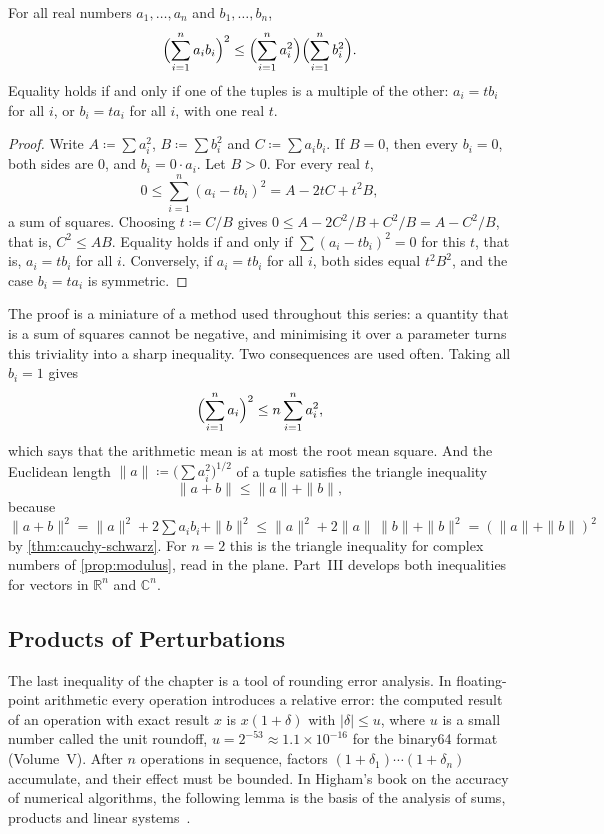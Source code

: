 \begin{theorem}
\label{thm:cauchy-schwarz}
For all real numbers $a_1,\ldots,a_n$ and $b_1,\ldots,b_n$,
\[
\Bigl(\sum_{i=1}^na_ib_i\Bigr)^2\le\Bigl(\sum_{i=1}^na_i^2\Bigr)\Bigl(\sum_{i=1}^nb_i^2\Bigr).
\]
Equality holds if and only if one of the tuples is a multiple of the other: $a_i=tb_i$ for all $i$, or $b_i=ta_i$ for all $i$, with one real $t$.
\end{theorem}

\begin{proof}
Write $A\coloneqq\sum a_i^2$, $B\coloneqq\sum b_i^2$ and $C\coloneqq\sum a_ib_i$. If $B=0$, then every $b_i=0$, both sides are $0$, and $b_i=0\cdot a_i$. Let $B>0$. For every real $t$,
\[
0\le\sum_{i=1}^n(a_i-tb_i)^2=A-2tC+t^2B ,
\]
a sum of squares. Choosing $t\coloneqq C/B$ gives $0\le A-2C^2/B+C^2/B=A-C^2/B$, that is, $C^2\le AB$. Equality holds if and only if $\sum(a_i-tb_i)^2=0$ for this $t$, that is, $a_i=tb_i$ for all $i$. Conversely, if $a_i=tb_i$ for all $i$, both sides equal $t^2B^2$, and the case $b_i=ta_i$ is symmetric.
\end{proof}

The proof is a miniature of a method used throughout this series: a quantity that is a sum of squares cannot be negative, and minimising it over a parameter turns this triviality into a sharp inequality. Two consequences are used often. Taking all $b_i=1$ gives
\[
\Bigl(\sum_{i=1}^na_i\Bigr)^2\le n\sum_{i=1}^na_i^2 ,
\]
which says that the arithmetic mean is at most the root mean square. And the Euclidean length $\|a\|\coloneqq\bigl(\sum a_i^2\bigr)^{1/2}$ of a tuple satisfies the triangle inequality
\begin{equation}
\|a+b\|\le\|a\|+\|b\| ,
\label{eq:minkowski}
\end{equation}
because $\|a+b\|^2=\|a\|^2+2\sum a_ib_i+\|b\|^2\le\|a\|^2+2\|a\|\,\|b\|+\|b\|^2=(\|a\|+\|b\|)^2$ by \cref{thm:cauchy-schwarz}. For $n=2$ this is the triangle inequality for complex numbers of \cref{prop:modulus}, read in the plane. Part~III develops both inequalities for vectors in $\mathbb R^n$ and $\mathbb C^n$.

\subsection{Products of Perturbations}

The last inequality of the chapter is a tool of rounding error analysis. In floating-point arithmetic every operation introduces a relative error: the computed result of an operation with exact result $x$ is $x(1+\delta)$ with $|\delta|\le u$, where $u$ is a small number called the unit roundoff, $u=2^{-53}\approx1.1\times10^{-16}$ for the binary64 format (Volume~V). After $n$ operations in sequence, factors $(1+\delta_1)\cdots(1+\delta_n)$ accumulate, and their effect must be bounded. In Higham's book on the accuracy of numerical algorithms, the following lemma is the basis of the analysis of sums, products and linear systems~\cite{higham2002accuracy}.

